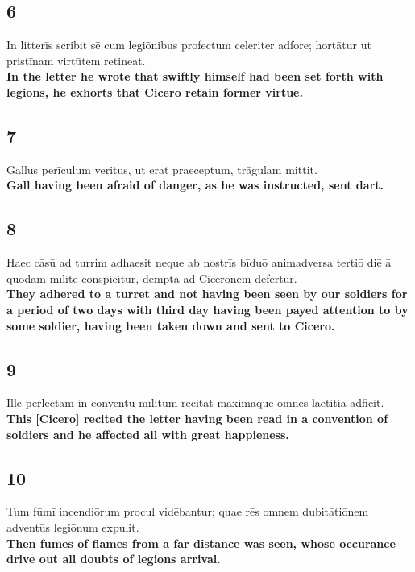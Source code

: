 \documentclass{article}
\begin{document}
\subsection*{6}
In litterīs scribit sē cum legiōnibus profectum celeriter adfore; hortātur ut pristīnam virtūtem retineat. \\
\textbf{In the letter he wrote that swiftly himself had been set forth with legions, he exhorts that Cicero retain former virtue.}

\subsection*{7}
Gallus perīculum veritus, ut erat praeceptum, trāgulam mittit. \\
\textbf{Gall having been afraid of danger, as he was instructed, sent dart.}

\subsection*{8}
Haec cāsū ad turrim adhaesit neque ab nostrīs bīduō animadversa tertiō diē ā quōdam mīlite cōnspicitur, dempta ad Cicerōnem dēfertur. \\
\textbf{They adhered to a turret and not having been seen by our soldiers for a period of two days with third day having been payed attention to by some soldier, having been taken down and sent to Cicero.}

\subsection*{9}
Ille perlectam in conventū mīlitum recitat maximāque omnēs laetitiā adficit. \\
\textbf{This [Cicero] recited the letter having been read in a convention of soldiers and he affected all with great happieness.}

\subsection*{10}
Tum fūmī incendiōrum procul vidēbantur; quae rēs omnem dubitātiōnem adventūs legiōnum expulit.\\
\textbf{Then fumes of flames from a far distance was seen, whose occurance drive out all doubts of legions arrival.}
\end{document}
